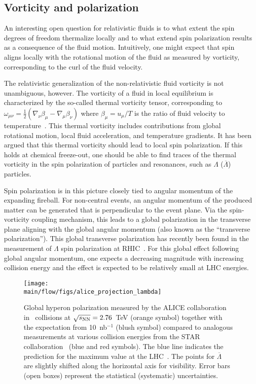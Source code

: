 \subsection{Vorticity and polarization}

An interesting open question for relativistic fluids is to what extent the 
  spin degrees of freedom thermalize locally and to what extend spin 
  polarization results as a consequence of the fluid motion. 
Intuitively, one might expect that spin aligns locally with the rotational 
  motion of the fluid as measured by vorticity, corresponding to the curl 
  of the fluid velocity.

The relativistic generalization of the non-relativistic fluid vorticity is 
  not unambiguous, however. 
The vorticity of a fluid in local equilibrium is characterized by the so-called 
  thermal vorticity tensor, corresponding to $\omega_{\mu\nu} = \frac{1}{2} 
  (\nabla_\nu \beta_\mu - \nabla_\mu \beta_\nu)$ where $\beta_\mu=u_\mu / T$ 
  is the ratio of fluid velocity to temperature~\cite{Becattini:2013fla}. 
This thermal vorticity includes contributions from global rotational motion, 
  local fluid acceleration, and temperature gradients. 
It has been argued that this thermal vorticity should lead to local 
  spin polarization. 
If this holds at chemical freeze-out, one should be able to find traces of the 
  thermal vorticity in the spin polarization of particles and resonances, 
  such as $\Lambda$ ($\overline{\Lambda}$) particles.

Spin polarization is in this picture closely tied to angular momentum of the 
  expanding fireball. 
For non-central events, an angular momentum of the produced matter can be 
  generated that is perpendicular to the event plane. 
Via the spin-vorticity coupling mechanism, this leads to a global polarization 
  in the transverse plane aligning with the global angular momentum (also known 
  as the ``transverse polarization''). 
This global transverse polarization has recently been found in the measurement 
  of $\Lambda$ spin polarization at RHIC~\cite{STAR:2017ckg}. 
For this global effect following global angular momentum, one expects a 
  decreasing magnitude with increasing collision energy and the effect is 
  expected to be relatively small at LHC energies. 

\begin{figure*}[!htb]
\begin{center}
\texttt{[image: \\main/flow/figs/alice\_projection\_lambda]}
\caption{
Global hyperon polarization measured by the ALICE collaboration in \pbpb\ 
  collisions at $\sqrt{s_{\mathrm{NN}}}=2.76$~TeV (orange symbol) together with the expectation 
  from 10~nb$^{-1}$ (blush symbol) compared to analogous measurements at 
  various collision energies from the STAR 
  collaboration~\cite{STAR:2017ckg, Abelev:2007zk} (blue and red symbols). 
The blue line indicates the prediction for the maximum value at the 
  LHC~\cite{Voloshin:ICPPA2}. 
The points for $\overline{\Lambda}$ are slightly shifted along the horizontal 
  axis for visibility.  
Error bars (open boxes) represent the statistical (systematic) uncertainties.}
\label{fig:alice_lambda}
\end{center}
\end{figure*}

